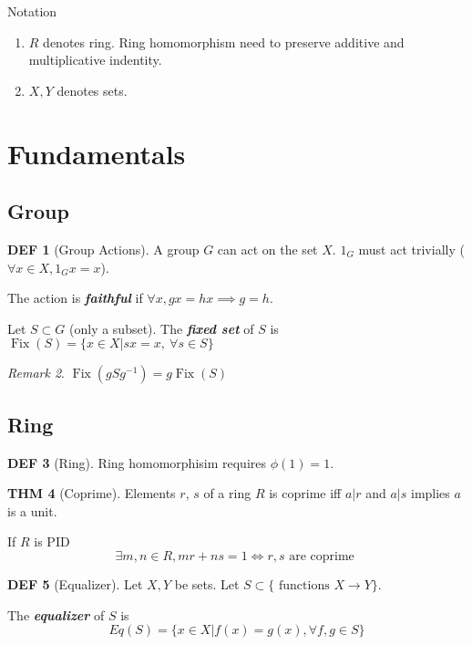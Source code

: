 \documentclass[twocolumn]{article}
\renewcommand{\emph}[1]{\textbf{\textit{#1}}}
\DeclareMathOperator{\Fix}{Fix}
\theoremstyle{definition}
\newtheorem{thm}{THM}
\newtheorem{defi}[thm]{DEF}
\theoremstyle{remark}
\newtheorem{remark}[thm]{Remark}
\begin{document}
\begin{fdefi}{Notation}{}
	\begin{enumerate}
		\item $R$ denotes ring. 
			Ring homomorphism need to preserve additive and multiplicative indentity.
		\item $X, Y$ denotes sets.
	\end{enumerate}
\end{fdefi}
\hrulefill

\section{Fundamentals}

\subsection{Group}

\begin{defi}[Group Actions]
	A group $G$ can act on the set $X$. 
	$1_G$ must act trivially ($\forall x \in X,  1_G x = x$).

	The action is \emph{faithful} if $\forall x, gx = hx\implies g =h$.

	Let $S \subset G$ (only a subset). The \emph{fixed set} of $S$ is 
	$\Fix(S) = \{x \in X| sx = x,\ \forall s \in S\}$
\end{defi}
\begin{remark}
	$\Fix(gSg^{-1}) = g \Fix(S)$
\end{remark}

\subsection{Ring}
\begin{defi}[Ring]
	Ring homomorphisim requires $\phi(1) = 1$.
\end{defi}

\begin{thm}[Coprime]
	Elements $r$, $s$ of a ring $R$ is coprime iff $a|r$ and $a|s$ implies $a$ is a unit.

	If $R$ is PID 
	$$
	\exists m, n \in R, mr + ns = 1 \iff r, s \text{ are coprime }
	$$ 
\end{thm}

\begin{defi}[Equalizer]
	Let $X, Y$ be sets. 
	Let $S \subset \{\text{ functions } X \rightarrow  Y\}$.

	The \emph{equalizer} of $S$ is 
	$$
		Eq(S) = \{x \in X| f(x) = g(x), \forall f, g \in S\}
	$$
\end{defi}
\end{document}
